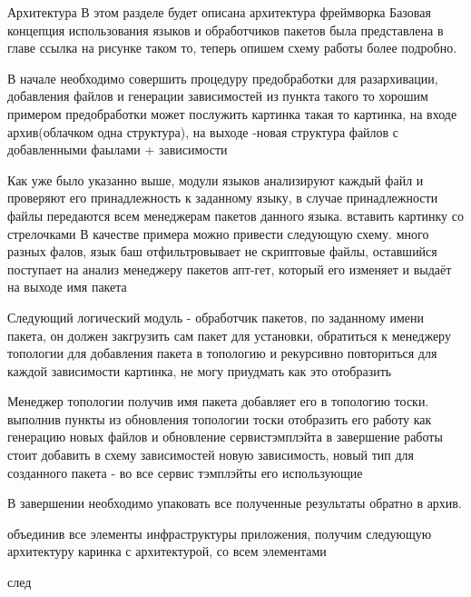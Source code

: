 Архитектура
В этом разделе будет описана архитектура фреймворка
Базовая концепция использования языков и обработчиков пакетов была представлена в главе ссылка на рисунке таком то, теперь опишем схему работы более подробно. 

В начале необходимо совершить процедуру предобработки для разархивации, добавления файлов и генерации зависимостей из пункта такого то
хорошим примером предобработки может послужить картинка такая то
картинка, на входе архив(облачком одна структура), на выходе -новая структура файлов с добавленными фаылами + зависимости

Как уже было указанно выше, модули языков анализируют каждый файл и проверяют его принадлежность к заданному языку, в случае принадлежности файлы передаются всем менеджерам пакетов данного языка. 
вставить картинку со стрелочками
В качестве примера можно привести следующую схему.
много разных фалов, язык баш отфильтровывает не скриптовые файлы, оставшийся поступает на анализ менеджеру пакетов апт-гет, который его изменяет и выдаёт на выходе имя пакета

Следующий логический модуль - обработчик пакетов, по заданному имени пакета, он должен закгрузить сам пакет для установки, обратиться к менеджеру топологии для добавления пакета в топологию и рекурсивно повториться для каждой зависимости
картинка, не могу приудмать как это отобразить

Менеджер топологии получив имя пакета добавляет его в топологию тоски. выполнив пункты из обновления топологии тоски
отобразить его работу как генерацию новых файлов и обновление сервистэмплэйта
в завершение работы стоит добавить в схему зависимостей новую зависимость, новый тип для созданного пакета - во все сервис тэмплэйты его использующие

В завершении необходимо упаковать все полученные результаты обратно в архив.

объединив все элементы инфраструктуры приложения,  получим следующую архитектуру
каринка с архитектурой, со всем элементами

след



\fi